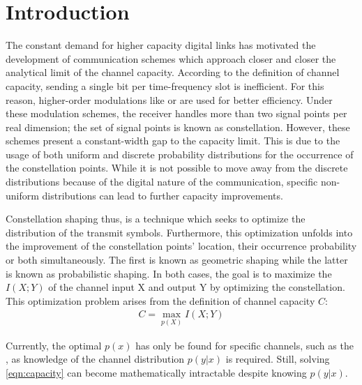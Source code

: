 \chapter{Introduction}\label{chap:introduction}

The constant demand for higher capacity digital links has motivated the development of communication schemes which approach closer and closer the analytical limit of the channel capacity. According to the definition of channel capacity, sending a single bit per time-frequency slot is inefficient. For this reason, higher-order modulations like  or  are used for better efficiency. Under these modulation schemes, the receiver handles more than two signal points per real dimension; the set of signal points is known as constellation. However, these schemes present a constant-width gap to the capacity limit. This is due to the usage of both uniform and discrete probability distributions for the occurrence of the constellation points. While it is not possible to move away from the discrete distributions because of the digital nature of the communication, specific non-uniform distributions can lead to further capacity improvements. 

Constellation shaping thus, is a technique which seeks to optimize the distribution of the transmit symbols. Furthermore, this optimization unfolds into the improvement of the constellation points' location, their occurrence probability or both simultaneously. The first is known as geometric shaping while the latter is known as probabilistic shaping. In both cases, the goal is to maximize the  $I(X;Y)$ of the channel input X and output Y by optimizing the constellation. This optimization problem arises from the definition of channel capacity $C$:
\begin{align}
\label{eqn:capacity}
	C = \max_{p(X)} I(X;Y)
\end{align}

Currently, the optimal $p(x)$ has only be found for specific channels, such as the , as knowledge of the channel distribution $p(y|x)$ is required. Still, solving \ref{eqn:capacity} can become mathematically intractable despite knowing $p(y|x)$.

